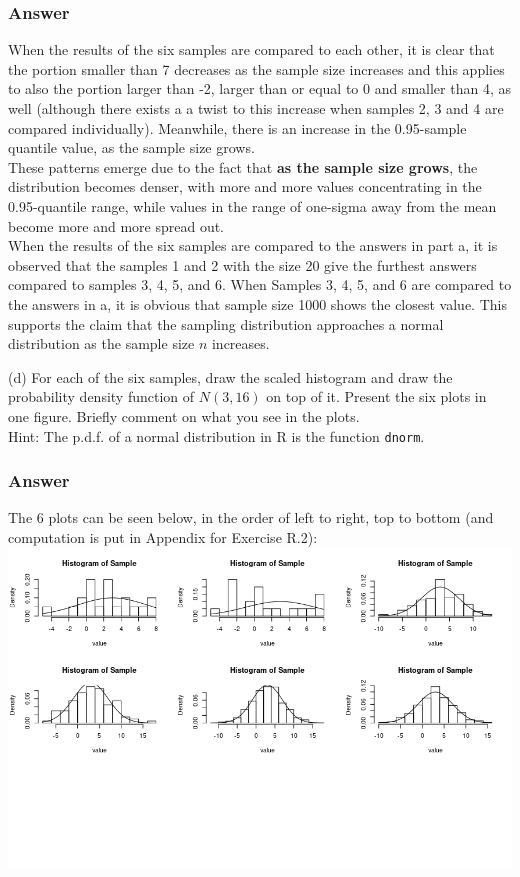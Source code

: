 \documentclass[12pt]{article}
\begin{document}
\subsubsection*{Answer}
When the results of the six samples are compared to each other, it is clear that the portion smaller than 7 decreases as the sample size increases and this applies to also the portion larger than -2, larger than or equal to 0 and smaller than 4, as well (although there exists a a twist to this increase when samples 2, 3 and 4 are compared individually). Meanwhile, there is an increase in the 0.95-sample quantile value, as the sample size grows. \\
These patterns emerge due to the fact that \textbf{as the sample size grows}, the distribution becomes denser, with more and more values concentrating in the 0.95-quantile range, while values in the range of one-sigma away from the mean become more and more spread out.  \\
When the results of the six samples are compared to the answers in part a, it is observed that the samples 1 and 2 with the size 20 give the furthest answers compared to samples 3, 4, 5, and 6. When Samples 3, 4, 5, and 6 are compared to the answers in a, it is obvious that sample size 1000 shows the closest value. This supports the claim that the sampling distribution approaches a normal distribution as the sample size $n$ increases.

(d) For each of the six samples, draw the scaled histogram and draw the probability density function of $N(3, 16)$ on top of it. Present the six plots in one figure. Briefly comment on what you see in the plots.\\
Hint: The p.d.f. of a normal distribution in R is the function \texttt{dnorm}.

\subsubsection*{Answer}

The 6 plots can be seen below, in the order of left to right, top to bottom (and computation is put in Appendix for Exercise R.2):\\

\includegraphics[width=\textwidth]{Ex2AllPlots}
\end{document}

